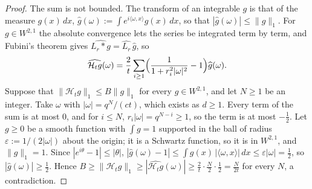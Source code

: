 \begin{proof}
The sum is not bounded. The transform of an integrable $g$ is that of the measure $g(x)\,dx$,
$\widehat g(\omega) := \int e^{i\langle\omega, x\rangle}g(x)\,dx$, so that
$|\widehat g(\omega)| \le \|g\|_1$. For $g \in W^{2,1}$ the absolute convergence lets the series
be integrated term by term, and Fubini's theorem gives $\widehat{L_r * g} = \widehat{L_r}\,\widehat g$,
so
\[
  \widehat{\mathcal{H}_tg}(\omega)
   = \frac2t\sum_{i \ge 1}\Bigl(\frac{1}{1 + r_i^2|\omega|^2} - 1\Bigr)\widehat g(\omega) .
\]
Suppose that $\|\mathcal{H}_tg\|_1 \le B\|g\|_1$ for every $g \in W^{2,1}$, and let $N \ge 1$ be an
integer. Take $\omega$ with $|\omega| = q^N/(ct)$, which exists as $d \ge 1$. Every term of the sum
is at most $0$, and for $i \le N$, $r_i|\omega| = q^{N-i} \ge 1$, so the term is at most
$-\tfrac12$. Let $g \ge 0$ be a smooth function with $\int g = 1$ supported in the ball of radius
$\varepsilon := 1/(2|\omega|)$ about the origin; it is a Schwartz function, so it is in $W^{2,1}$,
and $\|g\|_1 = 1$. Since $|e^{i\theta} - 1| \le |\theta|$,
$|\widehat g(\omega) - 1| \le \int g(x)\,|\langle\omega, x\rangle|\,dx \le \varepsilon|\omega| = \tfrac12$,
so $|\widehat g(\omega)| \ge \tfrac12$. Hence
$B \ge \|\mathcal{H}_tg\|_1 \ge |\widehat{\mathcal{H}_tg}(\omega)| \ge \frac2t\cdot\frac N2\cdot\frac12
= \frac{N}{2t}$ for every $N$, a contradiction.


\end{proof}
